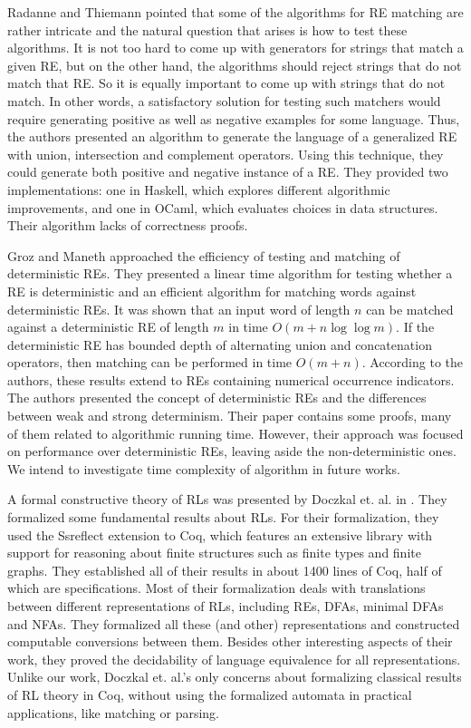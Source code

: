 \documentclass[review]{elsarticle}
\theoremstyle{definition}
\begin{document}
Radanne and Thiemann \cite{radanne:hal-01788827} pointed that some of the algorithms for RE matching are rather intricate and the natural question that arises is how to test these algorithms. It is not too hard to come up with generators for strings that match a given RE, but on the other hand, the algorithms should reject strings that do not match that RE. So it is equally important to come up with strings that do not match. In other words, a satisfactory solution for testing such matchers would require generating positive as well as negative examples for some language. Thus, the authors presented an algorithm to generate the language of a generalized RE with union, intersection and complement operators. Using this technique, they could generate both positive and negative instance of a RE. They provided two implementations: one in Haskell, which explores different algorithmic improvements, and one in OCaml, which evaluates choices in data structures. Their algorithm lacks of correctness proofs. 

Groz and Maneth \cite{Groz2017} approached the efficiency of testing and matching of deterministic REs. They presented a linear time algorithm for testing whether a RE is deterministic and an efficient algorithm for matching words against deterministic REs. It was shown that an input word of length $n$ can be matched against a deterministic RE of length $m$ in time $O (m + n  \log \log m)$. If the deterministic RE has bounded depth of alternating union and concatenation operators, then matching can be performed in time $O (m + n)$. According to the authors, these results extend to REs containing numerical occurrence indicators. The authors presented the concept of deterministic REs and the differences between weak and strong determinism. Their paper contains some proofs, many of them related to algorithmic running time. However, their approach was focused on performance over deterministic REs, leaving aside the non-deterministic ones. We intend to investigate time complexity of algorithm in future works. 

A formal constructive theory of RLs was presented by Doczkal et. al. in \cite{Doczkal2013}. They formalized some fundamental results about RLs. For their formalization, they used the Ssreflect extension to Coq, which features an extensive library with support for reasoning about finite structures such as finite types and finite graphs. They established all of their results in about 1400 lines of Coq, half of which are specifications. Most of their formalization deals with translations between different representations of RLs, including REs, DFAs, minimal DFAs and NFAs. They formalized all these (and other) representations and constructed computable conversions between them. Besides other interesting aspects of their work, they proved the decidability of language equivalence for all representations. Unlike our work, Doczkal et. al.'s only concerns about formalizing classical results of RL theory in Coq, without using the formalized automata in practical applications, like matching or parsing.  
\end{document}
